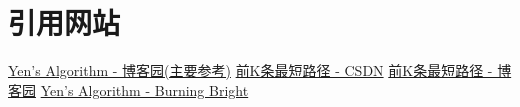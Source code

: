 \section{引用网站}
\noindent
\href{https://www.cnblogs.com/qq952693358/p/7354070.html}{Yen's Algorithm - 博客园(主要参考)}
\newline
\href{https://blog.csdn.net/sileiam/article/details/17054825?ops_request_misc=%257B%2522request%255Fid%2522%253A%252287d70334fefc193864c174592b03b362%2522%252C%2522scm%2522%253A%252220140713.130102334.pc%255Fall.%2522%257D&request_id=87d70334fefc193864c174592b03b362&biz_id=0&utm_medium=distribute.pc_search_result.none-task-blog-2~all~first_rank_ecpm_v1~rank_v31_ecpm-11-17054825-null-null.142^v100^pc_search_result_base5&utm_term=top%20k%20shortest&spm=1018.2226.3001.4187}{前K条最短路径 - CSDN}
\newline
\href{https://www.cnblogs.com/qq952693358/p/7354070.html}{前K条最短路径 - 博客园}
\newline
\href{https://www.linchenguang.com/2018/01/30/Yen-s-algorithm/}{Yen's Algorithm - Burning Bright}